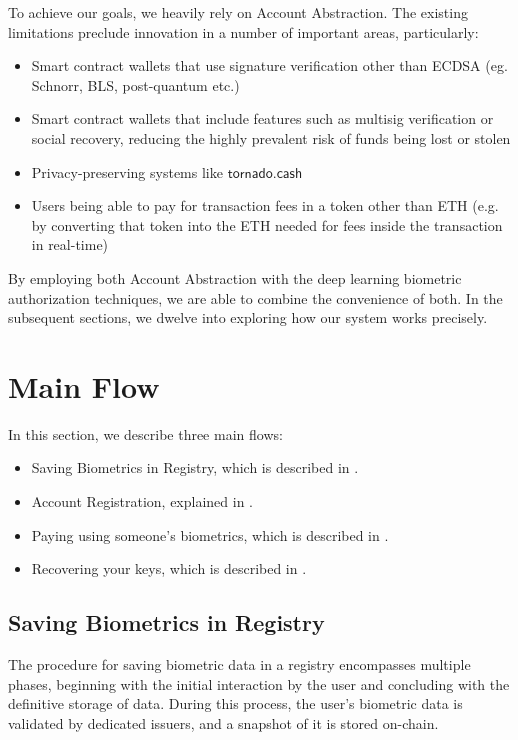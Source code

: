 \documentclass[a4, 14pt]{extarticle}
\begin{document}
To achieve our goals, we heavily rely on Account Abstraction. The existing limitations preclude innovation in a number of important areas, particularly:
\begin{itemize}
    \item Smart contract wallets that use signature verification other than ECDSA (eg. Schnorr, BLS, post-quantum etc.)
    \item Smart contract wallets that include features such as multisig verification or social recovery, reducing the highly prevalent risk of funds being lost or stolen
    \item Privacy-preserving systems like $\mathsf{tornado.cash}$
    \item Users being able to pay for transaction fees in a token other than ETH (e.g. by converting that token into the ETH needed for fees inside the transaction in real-time)
\end{itemize}

By employing both Account Abstraction with the deep learning biometric authorization techniques, we are able to combine the convenience of both. In the subsequent sections, we dwelve into exploring how our system works precisely.

\section{Main Flow}
In this section, we describe three main flows:
\begin{itemize}
    \item Saving Biometrics in Registry, which is described in .
    \item Account Registration, explained in .
    \item Paying using someone's biometrics, which is described in .
    \item Recovering your keys, which is described in .
\end{itemize}

\subsection{Saving Biometrics in Registry}\label{flow:getting_id}

The procedure for saving biometric data in a registry encompasses multiple phases, beginning with the initial interaction by the user and concluding with the definitive storage of data. During this process, the user's biometric data is validated by dedicated issuers, and a snapshot of it is stored on-chain.
\end{document}

